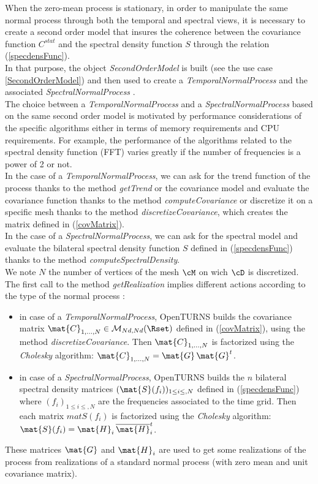 When the zero-mean process is stationary, in order to manipulate the same normal process through both the temporal and spectral views, it is necessary to create a second order model that insures the coherence between the covariance function $C^{stat}$  and the spectral density function $S$ through the relation (\ref{specdensFunc}). \\
In that purpose, the object {\itshape SecondOrderModel} is built (see the use case \ref{SecondOrderModel}) and then used to create a {\itshape TemporalNormalProcess} and the associated {\itshape SpectralNormalProcess} .\\
The choice between a {\itshape TemporalNormalProcess} and a {\itshape SpectralNormalProcess}  based on the same second order model is motivated by performance considerations of the specific algorithms either in terms of memory requirements and CPU requirements. For example, the performance of the algorithms related to the spectral density function (FFT) varies greatly if the number of frequencies is a power of 2 or not.\\

In the case of a {\itshape TemporalNormalProcess}, we can ask for the trend function of the process thanks to the method \emph{getTrend} or the covariance model and evaluate the covariance function  thanks to the method \emph{computeCovariance} or discretize  it on a specific mesh thanks to the method \emph{discretizeCovariance}, which creates the matrix defined in (\ref{covMatrix}).\\
In the case of a {\itshape SpectralNormalProcess}, we can ask for the spectral model and evaluate the bilateral spectral density function $S$ defined in (\ref{specdensFunc}) thanks to the method \emph{computeSpectralDensity}.\\

We note $N$ the number of vertices of the mesh $\cM$ on wich $\cD$ is discretized.\\
The first call to the method \emph{getRealization} implies different actions according to the type of the   normal process :
\begin{itemize}
\item in case of a {\itshape TemporalNormalProcess}, OpenTURNS builds the covariance matrix $\mat{C}_{1,\dots,N} \in \mathcal{M}_{Nd,Nd}(\Rset     )$ defined in (\ref{covMatrix}), using the  method \emph{discretizeCovariance}. Then $\mat{C}_{1,\dots,N}$ is factorized using the \emph{Cholesky} algorithm:  $\mat{C}_{1,\dots,N} = \mat{G} \, \mat{G}^{t}$.
\item in case of a {\itshape SpectralNormalProcess}, OpenTURNS builds the $n$ bilateral spectral density matrices $(\mat{S}(f_i))_{1 \leq i \leq,N}$ defined in (\ref{specdensFunc}) where $(f_i)_{1 \leq i \leq,N}$ are the frequencies associated to the time grid. Then each matrix $mat{S}(f_i)$ is factorized using the \emph{Cholesky} algorithm:  $\mat{S}(f_i) = \mat{H}_i \, \overline{\mat{H}}_i^{t}$.
\end{itemize}
These matrices $\mat{G}$ and $\mat{H}_i$ are used to get some realizations of the process from realizations of a standard normal process (with zero mean and unit covariance matrix). \\

